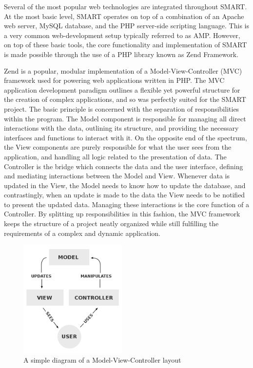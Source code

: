 \documentclass[12pt]{article}
\begin{document}
Several of the most popular web technologies are integrated throughout SMART. At the most basic level, SMART operates on top of a combination of an Apache web server, MySQL database, and the PHP server-side scripting language. This is a very common web-development setup typically referred to as AMP. However, on top of these basic tools, the core functionality and implementation of SMART is made possible through the use of a PHP library known as Zend Framework.

Zend is a popular, modular implementation of a Model-View-Controller (MVC) framework used for powering web applications written in PHP. The MVC application development paradigm outlines a flexible yet powerful structure for the creation of complex applications, and so was perfectly suited for the SMART project. The basic principle is concerned with the separation of responsibilities within the program. The Model component is responsible for managing all direct interactions with the data, outlining its structure, and providing the necessary interfaces and functions to interact with it. On the opposite end of the spectrum, the View components are purely responsible for what the user sees from the application, and handling all logic related to the presentation of data. The Controller is the bridge which connects the data and the user interface, defining and mediating interactions between the Model and View. Whenever data is updated in the View, the Model needs to know how to update the database, and contrastingly, when an update is made to the data the View needs to be notified to present the updated data. Managing these interactions is the core function of a Controller. By splitting up responsibilities in this fashion, the MVC framework keeps the structure of a project neatly organized while still fulfilling the requirements of a complex and dynamic application.

\begin{figure}[h]
    \begin{center}
        \centerline{\includegraphics[width=2.1in]{diagrams/MVC.png}}
    \end{center}
    \begin{spacing}{1.0}\caption{A simple diagram of a Model-View-Controller layout\protect\footnotemark}\end{spacing}
\end{figure}
\end{document}
